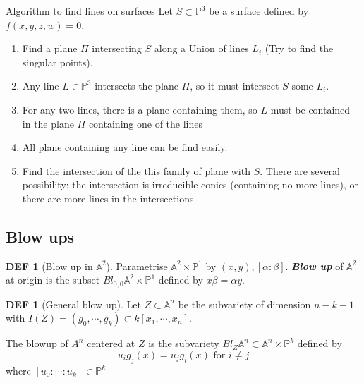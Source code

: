 \documentclass[twocolumn]{article}
\renewcommand{\emph}[1]{\textbf{\textit{#1}}}
\newcommand{\A}{\mathbb{A}}
\renewcommand{\P}{\mathbb{P}}
\theoremstyle{definition}
\newtheorem{defi}[thm]{DEF}
\theoremstyle{remark}
\begin{document}
\begin{fthm}{Algorithm to find lines on surfaces}{}
	Let $S \subset \P^3$ be a surface defined by $f(x,y,z,w) = 0$. 
	\begin{enumerate}
		\item Find a plane $\Pi$ intersecting $S$ along a Union of lines $L_i$ (Try to find the singular points).
		\item Any line $L \in \P^3$ intersects the plane $\Pi$, so it must intersect $S$ some $L_i$.
		\item For any two lines, there is a plane containing them, so $L$ must be contained in the plane $\Pi$ containing one of the lines
		\item All plane containing any line can be find easily.
		\item Find the intersection of the this family of plane with $S$. There are several possibility: the intersection is irreducible conics (containing no more lines), or there are more lines in the intersections. 
	\end{enumerate}
\end{fthm}

\subsection{Blow ups}

\begin{defi}[Blow up in $\A^2$]
	Parametrise $\A^2 \times \P^1$ by $(x,y), [\alpha: \beta]$. \emph{Blow up} of $\A^2$ at origin is the subset $Bl_{0,0} \A^2 \times \P^1$ defined by $x \beta = \alpha y$.
\end{defi}

\begin{defi}[General blow up]
	Let $Z \subset \A^n$ be the subvariety of dimension $n - k - 1$ with $I(Z) = (g_0, \cdots, g_k) \subset k[x_1, \cdots, x_n]$.

	The blowup of $A^n$ centered at $Z$ is the subvariety $Bl_Z \A^n \subset \A^n \times \P^k$ defined by 
	$$
	u_i g_j(x) = u_j g_i(x) \text{ for } i \neq j
	$$
	where $[u_0: \cdots : u_k] \in \P^k$
\end{defi}
\end{document}
